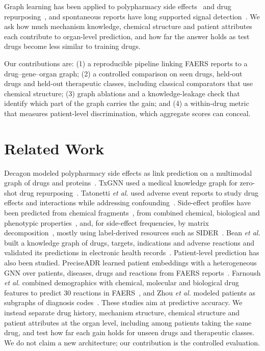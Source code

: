 \documentclass[conference,letterpaper]{IEEEtran}
\begin{document}
Graph learning has been applied to polypharmacy side effects~\cite{zitnik2018} and drug repurposing~\cite{huang2024}, and spontaneous reports have long supported signal detection~\cite{tatonetti2012}. We ask how much mechanism knowledge, chemical structure and patient attributes each contribute to organ-level prediction, and how far the answer holds as test drugs become less similar to training drugs.

Our contributions are: (1) a reproducible pipeline linking FAERS reports to a drug--gene--organ graph; (2) a controlled comparison on seen drugs, held-out drugs and held-out therapeutic classes, including classical comparators that use chemical structure; (3) graph ablations and a knowledge-leakage check that identify which part of the graph carries the gain; and (4) a within-drug metric that measures patient-level discrimination, which aggregate scores can conceal.

\section{Related Work}
Decagon modeled polypharmacy side effects as link prediction on a multimodal graph of drugs and proteins~\cite{zitnik2018}. TxGNN used a medical knowledge graph for zero-shot drug repurposing~\cite{huang2024}. Tatonetti \emph{et al.} used adverse event reports to study drug effects and interactions while addressing confounding~\cite{tatonetti2012}. Side-effect profiles have been predicted from chemical fragments~\cite{pauwels2011}, from combined chemical, biological and phenotypic properties~\cite{liu2012}, and, for side-effect frequencies, by matrix decomposition~\cite{galeano2020}, mostly using label-derived resources such as SIDER~\cite{kuhn2016}. Bean \emph{et al.} built a knowledge graph of drugs, targets, indications and adverse reactions and validated its predictions in electronic health records~\cite{bean2017}. Patient-level prediction has also been studied. PreciseADR learned patient embeddings with a heterogeneous GNN over patients, diseases, drugs and reactions from FAERS reports~\cite{gao2025}. Farnoush \emph{et al.} combined demographics with chemical, molecular and biological drug features to predict 30 reactions in FAERS~\cite{farnoush2024}, and Zhou \emph{et al.} modeled patients as subgraphs of diagnosis codes~\cite{zhou2024}. These studies aim at predictive accuracy. We instead separate drug history, mechanism structure, chemical structure and patient attributes at the organ level, including among patients taking the same drug, and test how far each gain holds for unseen drugs and therapeutic classes. We do not claim a new architecture; our contribution is the controlled evaluation.
\end{document}
